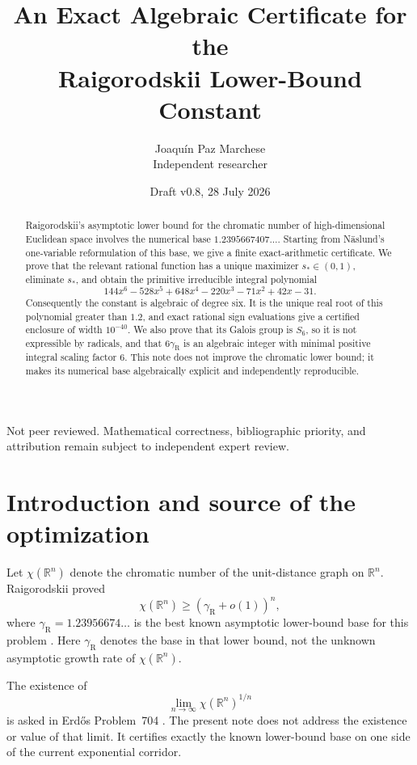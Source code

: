 \documentclass[11pt]{article}
\title{An Exact Algebraic Certificate for the\\Raigorodskii Lower-Bound Constant}
\author{Joaqu\'in Paz Marchese\\[2pt]\small Independent researcher}
\date{Draft v0.8, 28 July 2026}
\theoremstyle{remark}
\newcommand{\gR}{\gamma_{\mathrm R}}
\begin{document}
\maketitle

\begin{center}
\small\color{gray}
Not peer reviewed. Mathematical correctness, bibliographic priority, and attribution remain subject to independent expert review.
\end{center}

\begin{abstract}
Raigorodskii's asymptotic lower bound for the chromatic number of high-dimensional Euclidean space involves the numerical base
\(1.2395667407\ldots\). Starting from N\"aslund's one-variable reformulation of this base, we give a finite exact-arithmetic certificate. We prove that the relevant rational function has a unique maximizer \(s_*\in(0,1)\), eliminate \(s_*\), and obtain the primitive irreducible integral polynomial
\[
144x^6-528x^5+648x^4-220x^3-71x^2+42x-31.
\]
Consequently the constant is algebraic of degree six. It is the unique real root of this polynomial greater than \(1.2\), and exact rational sign evaluations give a certified enclosure of width \(10^{-40}\). We also prove that its Galois group is \(S_6\), so it is not expressible by radicals, and that \(6\gamma_{\mathrm R}\) is an algebraic integer with minimal positive integral scaling factor \(6\). This note does not improve the chromatic lower bound; it makes its numerical base algebraically explicit and independently reproducible.
\end{abstract}

\section{Introduction and source of the optimization}
Let \(\chi(\mathbb R^n)\) denote the chromatic number of the unit-distance graph on \(\mathbb R^n\). Raigorodskii proved
\[
\chi(\mathbb R^n)\geq (\gR+o(1))^n,
\]
where \(\gR=1.23956674\ldots\) is the best known asymptotic lower-bound base for this problem \cite{Raigorodskii2000,GorskayaEtAl2009,Naslund2023,Erdos704}. Here \(\gR\) denotes the base in that lower bound, not the unknown asymptotic growth rate of \(\chi(\mathbb R^n)\).

The existence of
\[
\lim_{n\to\infty}\chi(\mathbb R^n)^{1/n}
\]
is asked in Erd\H{o}s Problem~704 \cite{Erdos704}. The present note does not address the existence or value of that limit. It certifies exactly the known lower-bound base on one side of the current exponential corridor.
\end{document}
